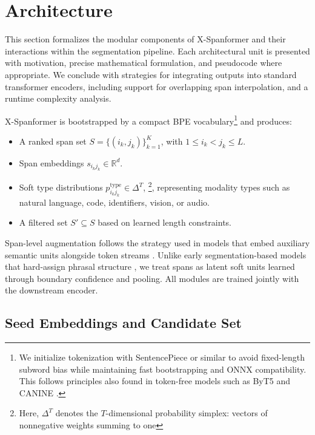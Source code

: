 \section{Architecture}

This section formalizes the modular components of X-Spanformer and their interactions within the segmentation pipeline. Each architectural unit is presented with motivation, precise mathematical formulation, and pseudocode where appropriate. We conclude with strategies for integrating outputs into standard transformer encoders, including support for overlapping span interpolation, and a runtime complexity analysis.

X-Spanformer is bootstrapped by a compact BPE vocabulary\footnote{\label{fn:bpe}We initialize tokenization with SentencePiece \cite{kudo2018sentencepiece} or similar to avoid fixed-length subword bias while maintaining fast bootstrapping and ONNX compatibility. This follows principles also found in token-free models such as ByT5 \cite{xue2022byt5} and CANINE \cite{clark2022canine}.} and produces:
\begin{itemize}
  \item A ranked span set \(S = \{(i_k,j_k)\}_{k=1}^K\), with \(1 \le i_k < j_k \le L\).
  \item Span embeddings \(s_{i_k j_k} \in \mathbb{R}^d\).
  \item Soft type distributions \( p^\mathrm{type}_{i_k j_k} \in \Delta^T \), \footnote{Here, \(\Delta^T\) denotes the \(T\)-dimensional probability simplex: vectors of nonnegative weights summing to one}, representing modality types such as natural language, code, identifiers, vision, or audio.
  \item A filtered set \(S' \subseteq S\) based on learned length constraints.
\end{itemize}

Span-level augmentation follows the strategy used in models that embed auxiliary semantic units alongside token streams \cite{joshi2020spanbert, devlin2019bert}. Unlike early segmentation-based models that hard-assign phrasal structure \cite{jackendoff1977xbar}, we treat spans as latent soft units learned through boundary confidence and pooling. All modules are trained jointly with the downstream encoder.

\subsection{Seed Embeddings and Candidate Set}

